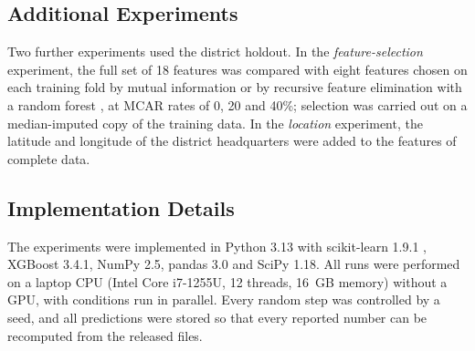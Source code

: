 \subsection{Additional Experiments}

Two further experiments used the district holdout. In the \emph{feature-selection} experiment,
the full set of 18 features was compared with eight features chosen on each training fold by
mutual information \cite{kraskov2004} or by recursive feature elimination with a random forest
\cite{guyon2002}, at MCAR rates of 0, 20 and 40\%; selection was carried out on a median-imputed
copy of the training data. In the \emph{location} experiment, the latitude and longitude of the
district headquarters were added to the features of complete data.

\subsection{Implementation Details}

The experiments were implemented in Python 3.13 with scikit-learn 1.9.1 \cite{pedregosa2011},
XGBoost 3.4.1, NumPy 2.5, pandas 3.0 and SciPy 1.18. All runs were performed on a laptop CPU
(Intel Core i7-1255U, 12 threads, 16~GB memory) without a GPU, with conditions run in parallel.
Every random step was controlled by a seed, and all predictions were stored so that every reported
number can be recomputed from the released files.
